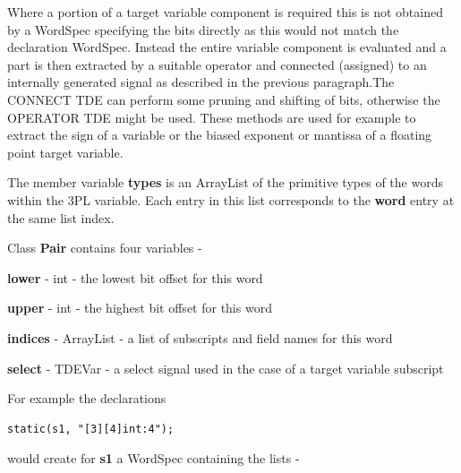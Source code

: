             Where a portion of a target variable component is required this is
            not obtained by a WordSpec specifying the bits directly as this
            would not match the declaration WordSpec. Instead the entire variable
            component is evaluated and a part is then extracted by a suitable
            operator and connected (assigned) to an internally generated
            signal as described in the previous paragraph.The CONNECT TDE
            can perform some pruning and shifting of bits, otherwise the
            OPERATOR TDE might be used. These methods are used for example
            to extract the sign of a variable or the biased exponent or mantissa
            of a floating point target variable.

            The member variable {\bf types} is an ArrayList of the primitive types
            of the words within the 3PL variable. Each entry in this list
            corresponds to the {\bf word} entry at the same list index.

            Class {\bf Pair} contains four variables -
            \blist
            \item   {\bf lower} - int - the lowest bit offset for this word
            \item   {\bf upper} - int - the highest bit offset for this word
            \item   {\bf indices} - ArrayList - a list of subscripts and field
                    names for this word
            \item   {\bf select} - TDEVar - a select signal used in the case of a
                    target variable subscript
            \blend

            For example the declarations
            \begin{lstlisting}[gobble=12, language=threepl]
                static(s1, "[3][4]int:4");
            \end{lstlisting}
            would create for {\bf s1} a WordSpec containing the lists -

